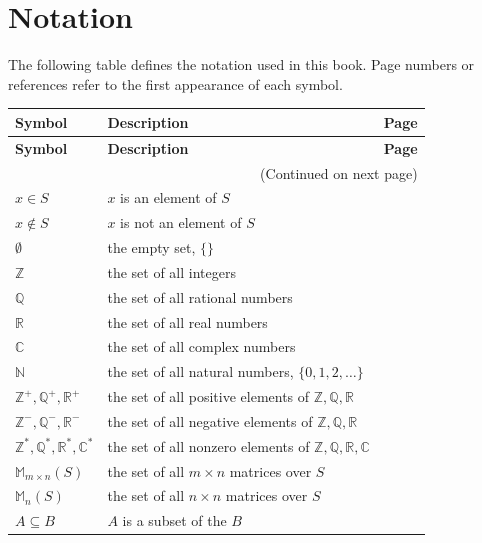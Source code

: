 \documentclass[10pt,]{book}
\theoremstyle{plain}
\theoremstyle{definition}
\theoremstyle{definition}
\theoremstyle{definition}
\theoremstyle{definition}
\numberwithin{equation}{section}
\def\Z{\mathbb{Z}}
\def\R{\mathbb{R}}
\def\Q{\mathbb{Q}}
\def\C{\mathbb{C}}
\def\N{\mathbb{N}}
\def\M{\mathbb{M}}
\begin{document}
%
%
%
\appendix
%
\typeout{************************************************}
\typeout{************************************************}
\chapter[{Notation}]{Notation}\label{appendix-1}
The following table defines the notation used in this book. Page numbers or references refer to the first appearance of each symbol.%
\begin{longtable}[l]{lp{}r}
\textbf{Symbol}&\textbf{Description}&\textbf{Page}\\[1em]
\endfirsthead
\textbf{Symbol}&\textbf{Description}&\textbf{Page}\\[1em]
\endhead
\multicolumn{3}{r}{(Continued on next page)}\\
\endfoot
\endlastfoot
$x \in S$&\(x\) is an element of \(S\)&\pageref{notation-1}\\
$x \not\in S$&\(x\) is not an element of \(S\)&\pageref{notation-2}\\
$\emptyset$&the empty set, \(\{\}\)&\pageref{notation-3}\\
$\Z$&the set of all integers&\pageref{notation-4}\\
$\Q$&the set of all rational numbers&\pageref{notation-5}\\
$\R$&the set of all real numbers&\pageref{notation-6}\\
$\C$&the set of all complex numbers&\pageref{notation-7}\\
$\N$&the set of all natural numbers, \(\{0,1,2,\ldots\}\)&\pageref{notation-8}\\
$\Z^+,\Q^+,\R^+$&the set of all positive elements of \(\Z,\Q,\R\)&\pageref{notation-9}\\
$\Z^-,\Q^-,\R^-$&the set of all negative elements of \(\Z,\Q,\R\)&\pageref{notation-10}\\
$\Z^*,\Q^*,\R^*,\C^*$&the set of all nonzero elements of \(\Z,\Q,\R,\C\)&\pageref{notation-11}\\
$\M_{m\times n}(S)$&the set of all \(m \times n\) matrices over \(S\)&\pageref{notation-12}\\
$\M_n(S)$&the set of all \(n \times n\) matrices over \(S\)&\pageref{notation-13}\\
$A\subseteq B$& \(A\) is a subset of the \(B\)&\pageref{notation-14}\\

\end{longtable}
\end{document}
